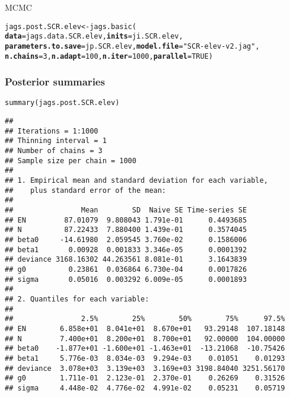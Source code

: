 \documentclass[color=usenames,dvipsnames]{beamer}\usepackage[]{graphicx}\usepackage[]{color}
\makeatletter
\newcommand{\hlnum}[1]{\textcolor[rgb]{0.69,0.494,0}{#1}}%
\newcommand{\hlstr}[1]{\textcolor[rgb]{0.749,0.012,0.012}{#1}}%
\newcommand{\hlstd}[1]{\textcolor[rgb]{0,0,0}{#1}}%
\newcommand{\hlkwb}[1]{\textcolor[rgb]{0,0.341,0.682}{#1}}%
\newcommand{\hlkwc}[1]{\textcolor[rgb]{0,0,0}{\textbf{#1}}}%
\newcommand{\hlkwd}[1]{\textcolor[rgb]{0.004,0.004,0.506}{#1}}%
\newenvironment{kframe}{%
 \def\at@end@of@kframe{}%
 \ifinner\ifhmode%
  \def\at@end@of@kframe{\end{minipage}}%
  \begin{minipage}{\columnwidth}%
 \fi\fi%
 \def\FrameCommand##1{\hskip\@totalleftmargin \hskip-\fboxsep
 \colorbox{shadecolor}{##1}\hskip-\fboxsep
     \hskip-\linewidth \hskip-\@totalleftmargin \hskip\columnwidth}%
 \MakeFramed {\advance\hsize-\width
   \@totalleftmargin\z@ \linewidth\hsize
   \@setminipage}}%
 {\par\unskip\endMakeFramed%
 \at@end@of@kframe}
\newenvironment{knitrout}{}{} %
\makeatother
\begin{document}
\begin{frame}[fragile]
\begin{knitrout}
\begin{kframe}
\begin{alltt}
\end{alltt}
\end{kframe}
\end{knitrout}
MCMC
  \vspace{-6pt}
\begin{knitrout}\scriptsize
{}\color{fgcolor}\begin{kframe}
\begin{alltt}
\hlstd{jags.post.SCR.elev} \hlkwb{<-} \hlkwd{jags.basic}\hlstd{(}
    \hlkwc{data}\hlstd{=jags.data.SCR.elev,} \hlkwc{inits}\hlstd{=ji.SCR.elev,}
    \hlkwc{parameters.to.save}\hlstd{=jp.SCR.elev,} \hlkwc{model.file}\hlstd{=}\hlstr{"SCR-elev-v2.jag"}\hlstd{,}
    \hlkwc{n.chains}\hlstd{=}\hlnum{3}\hlstd{,} \hlkwc{n.adapt}\hlstd{=}\hlnum{100}\hlstd{,} \hlkwc{n.iter}\hlstd{=}\hlnum{1000}\hlstd{,} \hlkwc{parallel}\hlstd{=}\hlnum{TRUE}\hlstd{)}
\end{alltt}
\end{kframe}
\end{knitrout}
\end{frame}




\begin{frame}[fragile]
  \frametitle{Posterior summaries}
\begin{knitrout}\tiny
{}\color{fgcolor}\begin{kframe}
\begin{alltt}
\hlkwd{summary}\hlstd{(jags.post.SCR.elev)}
\end{alltt}
\begin{verbatim}
## 
## Iterations = 1:1000
## Thinning interval = 1 
## Number of chains = 3 
## Sample size per chain = 1000 
## 
## 1. Empirical mean and standard deviation for each variable,
##    plus standard error of the mean:
## 
##                Mean        SD  Naive SE Time-series SE
## EN         87.01079  9.808043 1.791e-01      0.4493685
## N          87.22433  7.880400 1.439e-01      0.3574045
## beta0     -14.61980  2.059545 3.760e-02      0.1586006
## beta1       0.00928  0.001833 3.346e-05      0.0001392
## deviance 3168.16302 44.263561 8.081e-01      3.1643839
## g0          0.23861  0.036864 6.730e-04      0.0017826
## sigma       0.05016  0.003292 6.009e-05      0.0001893
## 
## 2. Quantiles for each variable:
## 
##                2.5%        25%        50%        75%      97.5%
## EN        6.858e+01  8.041e+01  8.670e+01   93.29148  107.18148
## N         7.400e+01  8.200e+01  8.700e+01   92.00000  104.00000
## beta0    -1.877e+01 -1.600e+01 -1.463e+01  -13.21068  -10.75426
## beta1     5.776e-03  8.034e-03  9.294e-03    0.01051    0.01293
## deviance  3.078e+03  3.139e+03  3.169e+03 3198.84040 3251.56170
## g0        1.711e-01  2.123e-01  2.370e-01    0.26269    0.31526
## sigma     4.448e-02  4.776e-02  4.991e-02    0.05231    0.05719
\end{verbatim}
\end{kframe}
\end{knitrout}
\end{frame}
\end{document}
